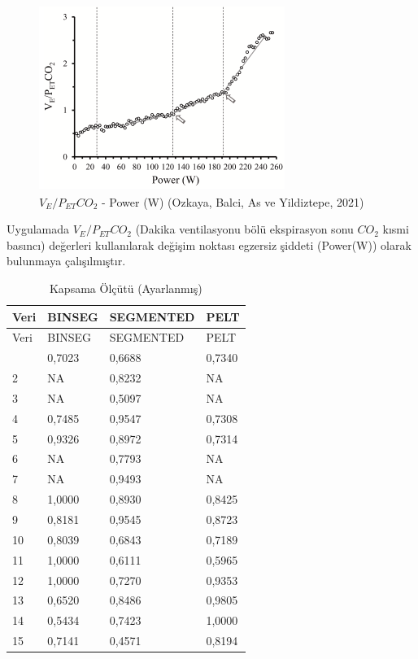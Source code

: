 \documentclass[12pt,twoside]{deuthesis}
\begin{document}
\begin{figure}
\includegraphics[width=302px,height=228px]{figure/vepetco2} \caption{\(V_E/P_{ET}CO_2\) - Power (W) (Ozkaya, Balci, As ve Yildiztepe, 2021)}\label{fig:unnamed-chunk-10}
\end{figure}

Uygulamada \(V_E/P_{ET}CO_2\) (Dakika ventilasyonu bölü ekspirasyon sonu \(CO_2\) kısmi basıncı) değerleri kullanılarak değişim noktası egzersiz şiddeti (Power(W)) olarak bulunmaya çalışılmıştır.

\begin{longtable}[]{@{}llll@{}}
\caption{\label{tab:nvar6} Kapsama Ölçütü (Ayarlanmış)}\tabularnewline
\toprule\noalign{}
Veri & BINSEG & SEGMENTED & PELT \\
\midrule\noalign{}
\endfirsthead
\toprule\noalign{}
Veri & BINSEG & SEGMENTED & PELT \\
\midrule\noalign{}
\endhead
\bottomrule\noalign{}
\endlastfoot
1 & 0,7023 & 0,6688 & 0,7340 \\
2 & NA & 0,8232 & NA \\
3 & NA & 0,5097 & NA \\
4 & 0,7485 & 0,9547 & 0,7308 \\
5 & 0,9326 & 0,8972 & 0,7314 \\
6 & NA & 0,7793 & NA \\
7 & NA & 0,9493 & NA \\
8 & 1,0000 & 0,8930 & 0,8425 \\
9 & 0,8181 & 0,9545 & 0,8723 \\
10 & 0,8039 & 0,6843 & 0,7189 \\
11 & 1,0000 & 0,6111 & 0,5965 \\
12 & 1,0000 & 0,7270 & 0,9353 \\
13 & 0,6520 & 0,8486 & 0,9805 \\
14 & 0,5434 & 0,7423 & 1,0000 \\
15 & 0,7141 & 0,4571 & 0,8194 \\
\end{longtable}
\end{document}
